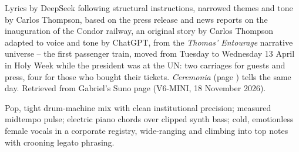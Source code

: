 
\label{sec:first-train-running}
\begin{notes}
Lyrics by DeepSeek following structural instructions, narrowed themes and tone by Carlos Thompson, based on the press release and news reports on the inauguration of the Condor railway, an original story by Carlos Thompson adapted to voice and tone by ChatGPT, from the \emph{Thomas' Entourage} narrative universe -- the first passenger train, moved from Tuesday to Wednesday 13 April in Holy Week while the president was at the UN: two carriages for guests and press, four for those who bought their tickets. \emph{Ceremonia} (page \pageref{sec:ceremonia}) tells the same day. Retrieved from Gabriel's Suno page (V6-MINI, 18 November 2026).
\end{notes}
\begin{style}
Pop, tight drum-machine mix with clean institutional precision; measured midtempo pulse; electric piano chords over clipped synth bass; cold, emotionless female vocals in a corporate registry, wide-ranging and climbing into top notes with crooning legato phrasing.
\end{style}
